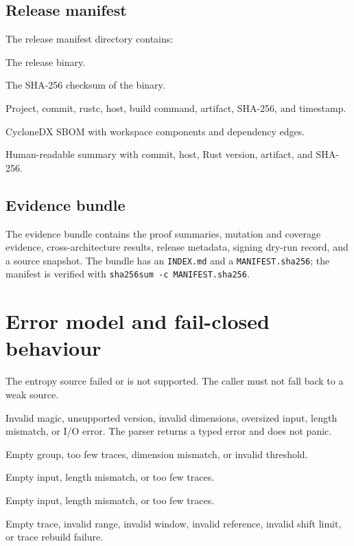 \documentclass[11pt,a4paper]{article}
\newcommand{\code}[1]{\texttt{#1}}
\theoremstyle{plain}
\theoremstyle{definition}
\theoremstyle{remark}
\begin{document}
\subsection{Release manifest}

The release manifest directory contains:

\begin{description}[leftmargin=1.5em]
  \item[\code{sicas-harness}] The release binary.
  \item[\code{SHA256SUMS}] The SHA-256 checksum of the binary.
  \item[\code{provenance.json}] Project, commit, rustc, host, build command, artifact,
        SHA-256, and timestamp.
  \item[\code{sbom.cdx.json}] CycloneDX SBOM with workspace components and dependency
        edges.
  \item[\code{README.md}] Human-readable summary with commit, host, Rust version,
        artifact, and SHA-256.
\end{description}

\subsection{Evidence bundle}

The evidence bundle contains the proof summaries, mutation and coverage evidence,
cross-architecture results, release metadata, signing dry-run record, and a source
snapshot. The bundle has an \code{INDEX.md} and a \code{MANIFEST.sha256}; the manifest is
verified with \code{sha256sum -c MANIFEST.sha256}.

\section{Error model and fail-closed behaviour}\label{sec:errors}

\begin{description}[leftmargin=1.5em]
  \item[\code{EntropyError::Unavailable}] The entropy source failed or is not
        supported. The caller must not fall back to a weak source.
  \item[\code{TraceError}] Invalid magic, unsupported version, invalid dimensions,
        oversized input, length mismatch, or I/O error. The parser returns a typed
        error and does not panic.
  \item[\code{TvlaError}] Empty group, too few traces, dimension mismatch, or invalid
        threshold.
  \item[\code{CpaError}] Empty input, length mismatch, or too few traces.
  \item[\code{DpaError}] Empty input, length mismatch, or too few traces.
  \item[\code{PreprocessError}] Empty trace, invalid range, invalid window, invalid
        reference, invalid shift limit, or trace rebuild failure.
\end{description}
\end{document}
